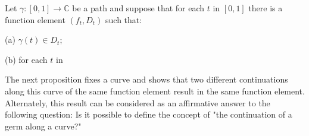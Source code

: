 Let $\gamma: [0, 1] \to \mathbb{C}$ be a path and suppose that for each $t$ in $[0, 1]$ there is a function element $(f_t, D_t)$ such that:

(a) $\gamma(t) \in D_t$;

(b) for each $t$ in

The next proposition fixes a curve and shows that two different continuations along this curve of the same function element result in the same function element. Alternately, this result can be considered as an affirmative answer to the following question: Is it possible to define the concept of "the continuation of a germ along a curve?"